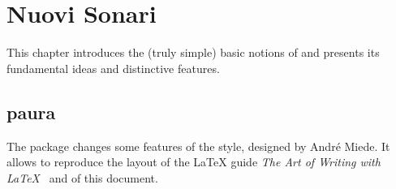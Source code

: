 
\chapter{Nuovi Sonari}
\label{chp:nuovisonari}

This chapter introduces the (truly simple) basic notions of \arsclassica{} and presents its fundamental ideas and distinctive features.



\section{paura}


The \arsclassica{} package changes some features of the \classicthesis{} style, designed by Andr\'e Miede. It allows to reproduce the layout of the \LaTeX{} guide \emph{The Art of Writing with \LaTeX}~\parencite{pantieri:arte} and of this document.

